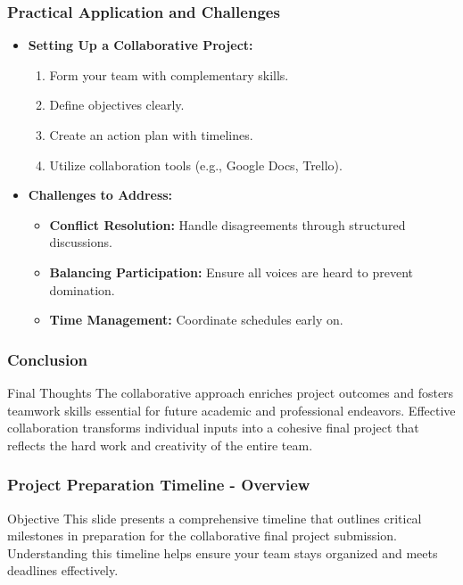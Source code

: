 \documentclass[aspectratio=169]{beamer}
\begin{document}
\begin{frame}[fragile]
    \frametitle{Practical Application and Challenges}

    \begin{itemize}
        \item \textbf{Setting Up a Collaborative Project:}
            \begin{enumerate}
                \item Form your team with complementary skills.
                \item Define objectives clearly.
                \item Create an action plan with timelines.
                \item Utilize collaboration tools (e.g., Google Docs, Trello).
            \end{enumerate}
        
        \item \textbf{Challenges to Address:}
            \begin{itemize}
                \item \textbf{Conflict Resolution:} Handle disagreements through structured discussions.
                \item \textbf{Balancing Participation:} Ensure all voices are heard to prevent domination.
                \item \textbf{Time Management:} Coordinate schedules early on.
            \end{itemize}
    \end{itemize}
\end{frame}

\begin{frame}[fragile]
    \frametitle{Conclusion}

    \begin{block}{Final Thoughts}
        The collaborative approach enriches project outcomes and fosters teamwork skills essential for future academic and professional endeavors. Effective collaboration transforms individual inputs into a cohesive final project that reflects the hard work and creativity of the entire team.
    \end{block}
    
\end{frame}

\begin{frame}[fragile]
    \frametitle{Project Preparation Timeline - Overview}
    \begin{block}{Objective}
        This slide presents a comprehensive timeline that outlines critical milestones in preparation for the collaborative final project submission. Understanding this timeline helps ensure your team stays organized and meets deadlines effectively.
    \end{block}
\end{frame}
\end{document}
